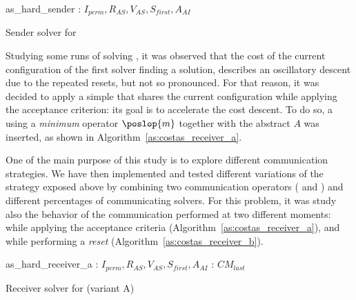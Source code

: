 \begin{algorithm}[H]
\dontprintsemicolon
\SetNoline
{}
   as\_hard\_sender\;
\algoindent {} : $I_{perm}, R_{AS}, V_{AS}, S_{first}, A_{AI}$ \;
\caption{Sender solver for \CARRP}\label{as:costas_sender}
\end{algorithm}

Studying some runs of \posl{} solving \CARRP{}, it was observed that the cost of the current configuration of the first solver finding a solution, describes an oscillatory descent due to the repeated resets, but not so pronounced. For that reason, it was decided to apply a simple \commstr{} that shares the current configuration while applying the acceptance criterion: its goal is to  accelerate the cost descent. To do so, a \opch{} using a \textit{minimum} operator $\poslop{m}$ together with the abstract \om{} $A$ was inserted, as shown in Algorithm~\ref{as:costas_receiver_a}.

One of the main purpose of this study is to explore different communication strategies. We have then implemented and tested different variations of the strategy exposed above by combining two communication operators (\oneTone{} and \oneTn) and different percentages of communicating solvers.
For this problem, it was study also the behavior of the communication performed at two different moments: while applying the acceptance criteria (Algorithm~\ref{as:costas_receiver_a}), and while performing a {\it reset} (Algorithm~\ref{as:costas_receiver_b}).

\begin{algorithm}[H]
\dontprintsemicolon
\SetNoline
{}
   as\_hard\_receiver\_a\;
\algoindent{} : $I_{perm}, R_{AS}, V_{AS}, S_{first}, A_{AI}$ \; 
\algoindent{}: $CM_{last}$\;
\caption{Receiver solver for \CARRP{} (variant A)}\label{as:costas_receiver_a}
\end{algorithm}

